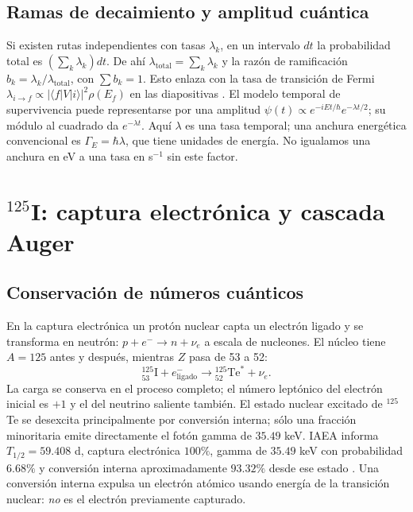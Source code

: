 \documentclass[11pt,a4paper]{article}
\newcommand{\I}{\mathrm I}\newcommand{\Te}{\mathrm{Te}}\newcommand{\Xe}{\mathrm{Xe}}
\begin{document}
\subsection{Ramas de decaimiento y amplitud cuántica}
Si existen rutas independientes con tasas $\lambda_k$, en un intervalo $dt$ la probabilidad total es $(\sum_k\lambda_k)dt$. De ahí $\lambda_{\mathrm{total}}=\sum_k\lambda_k$ y la razón de ramificación $b_k=\lambda_k/\lambda_{\mathrm{total}}$, con $\sum b_k=1$. Esto enlaza con la tasa de transición de Fermi $\lambda_{i\to f}\propto |\langle f|V|i\rangle|^2\rho(E_f)$ en las diapositivas \cite{curso}. El modelo temporal de supervivencia puede representarse por una amplitud $\psi(t)\propto e^{-iEt/\hbar}e^{-\lambda t/2}$; su módulo al cuadrado da $e^{-\lambda t}$. Aquí $\lambda$ es una tasa temporal; una anchura energética convencional es $\Gamma_E=\hbar\lambda$, que tiene unidades de energía. No igualamos una anchura en eV a una tasa en s$^{-1}$ sin este factor.

\section{$^{125}$I: captura electrónica y cascada Auger}
\subsection{Conservación de números cuánticos}
En la captura electrónica un protón nuclear capta un electrón ligado y se transforma en neutrón: $p+e^-\rightarrow n+\nu_e$ a escala de nucleones. El núcleo tiene $A=125$ antes y después, mientras $Z$ pasa de 53 a 52:
\begin{equation}{}^{125}_{53}\I+e^-_{\mathrm{ligado}}\longrightarrow{}^{125}_{52}\Te^*+\nu_e .\end{equation}
La carga se conserva en el proceso completo; el número leptónico del electrón inicial es $+1$ y el del neutrino saliente también. El estado nuclear excitado de $^{125}$Te se desexcita principalmente por conversión interna; sólo una fracción minoritaria emite directamente el fotón gamma de $35.49$ keV. IAEA informa $T_{1/2}=59.408$ d, captura electrónica $100\%$, gamma de $35.49$ keV con probabilidad $6.68\%$ y conversión interna aproximadamente $93.32\%$ desde ese estado \cite{iaea125}. Una conversión interna expulsa un electrón atómico usando energía de la transición nuclear: \emph{no} es el electrón previamente capturado.
\end{document}
